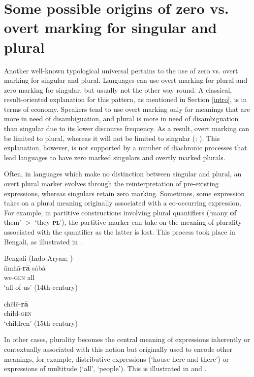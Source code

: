 \documentclass[output=paper]{langsci/langscibook}
\begin{document}
\section{Some possible origins of zero vs. overt marking for singular
  and plural}\label{number}
Another well-known typological
universal pertains to the use of zero vs. overt
marking for singular and plural. Languages can use overt marking for plural and zero marking for
  singular, but usually not the other way round. A classical,
  result-oriented explanation for this pattern, as
  mentioned in Section \ref{intro},  is in terms of economy. Speakers tend to use overt marking
  only for meanings that are more in need of disambiguation, and plural is more in need of disambiguation than singular due to its
  lower discourse frequency. As a result, overt marking can be limited
  to plural, whereas it will not be limited to singular (\citealt{Greenberg1966,TU2};
  \citealt{Haspelmath2008}).  This explanation, however, is not
supported by a number of diachronic processes that lead languages to
have zero marked singulars and overtly marked plurals.


Often, in languages which make no distinction between singular
and plural, an overt plural marker  evolves through the reinterpretation of
pre-existing expressions, whereas
    singulars retain zero marking. Sometimes, some expression  takes on a plural meaning originally associated with
      a co-occurring expression. For example, in partitive
      constructions involving plural quantifiers (`many
      {\bf of} them' $>$ `they  {\bf \textsc{pl}}'), the partitive marker can take on the meaning of
      plurality associated with the quantifier as the latter is
      lost. This process took place in  Bengali, as illustrated in .



\ea\label{bengali}
Bengali (Indo-Aryan; )\\
\ea
\gll āmhā-\textbf{{rā}} s{\r{a}}b{\r{a}}\\
we-\textsc{gen} all\\
\glt `all of us' (14th century)


\ex
\gll chēlē-\textbf{{rā}} \\
child-\textsc{gen}\\
\glt `children' (15th century)

\z
\z


In other cases, plurality becomes the central meaning of expressions
inherently or contextually
associated with this notion but originally used to encode other meanings, for example, distributive expressions
(`house here and there') or expressions of multitude (`all', `people'). This is illustrated in  and .
\end{document}
